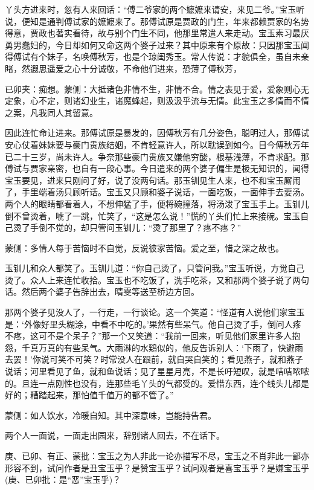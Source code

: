 \begin{parag}
    丫头方进来时，忽有人来回话：“傅二爷家的两个嬷嬷来请安，来见二爷。”宝玉听说，便知是通判傅试家的嬷嬷来了。那傅试原是贾政的门生，年来都赖贾家的名势得意，贾政也著实看待，故与别个门生不同，他那里常遣人来走动。宝玉素习最厌勇男蠢妇的，今日却如何又命这两个婆子过来？其中原来有个原故：只因那宝玉闻得傅试有个妹子，名唤傅秋芳，也是个琼闺秀玉。常人传说：才貌俱全，虽自未亲睹，然遐思遥爱之心十分诚敬，不命他们进来，恐薄了傅秋芳，\begin{note}已卯夹：痴想。蒙侧：大抵诸色非情不生，非情不合。情之表见于爱，爱象则心无定象，心不定，则诸幻业生，诸魔蜂起，则汲汲乎流与无情。此宝玉之多情而不情之案，凡我同人其留意。\end{note}因此连忙命让进来。那傅试原是暴发的，因傅秋芳有几分姿色，聪明过人，那傅试安心仗着妹妹要与豪门贵族结姻，不肯轻意许人，所以耽误到如今。目今傅秋芳年已二十三岁，尚未许人。争奈那些豪门贵族又嫌他穷酸，根基浅薄，不肯求配。那傅试与贾家亲密，也自有一段心事。今日遣来的两个婆子偏生是极无知识的，闻得宝玉要见，进来只刚问了好，说了没两句话。那玉钏见生人来，也不和宝玉厮闹了，手里端着汤只顾听话。宝玉又只顾和婆子说话，一面吃饭，一面伸手去要汤。两个人的眼睛都看着人，不想伸猛了手，便将碗撞落，将汤泼了宝玉手上。玉钏儿倒不曾烫着，唬了一跳，忙笑了，“这是怎么说！”慌的丫头们忙上来接碗。宝玉自己烫了手倒不觉的，却只管问玉钏儿：“烫了那里了？疼不疼？”\begin{note}蒙侧：多情人每于苦恼时不自觉，反说彼家苦恼。爱之至，惜之深之故也。\end{note}玉钏儿和众人都笑了。玉钏儿道：“你自己烫了，只管问我。”宝玉听说，方觉自己烫了。众人上来连忙收拾。宝玉也不吃饭了，洗手吃茶，又和那两个婆子说了两句话。然后两个婆子告辞出去，晴雯等送至桥边方回。
\end{parag}


\begin{parag}
    那两个婆子见没人了，一行走，一行谈论。这一个笑道：“怪道有人说他们家宝玉是：‘外像好里头糊涂，中看不中吃的。’果然有些呆气。他自己烫了手，倒问人疼不疼，这可不是个呆子？”那一个又笑道：“我前一回来，听见他们家里许多人抱怨，千真万真的有些呆气。大雨淋的水鶏似的，他反告诉别人：‘下雨了，快避雨去罢！’你说可笑不可笑？时常没人在跟前，就自哭自笑的；看见燕子，就和燕子说话；河里看见了鱼，就和鱼说话；见了星星月亮，不是长吁短叹，就是咭咭哝哝的。且连一点刚性也没有，连那些毛丫头的气都受的。爱惜东西，连个线头儿都是好的；糟踏起来，那怕值千值万的都不管了。”\begin{note}蒙侧：如人饮水，冷暖自知。其中深意味，岂能持告君。\end{note}两个人一面说，一面走出园来，辞别诸人回去，不在话下。\begin{note}庚、已卯、有正、蒙批：宝玉之为人非此一论亦描写不尽，宝玉之不肖非此一鄙亦形容不到，试问作者是丑宝玉乎？是赞宝玉乎？试问观者是喜宝玉乎？是嫌宝玉乎(庚、已卯批：是“恶”宝玉乎)？\end{note}
\end{parag}


